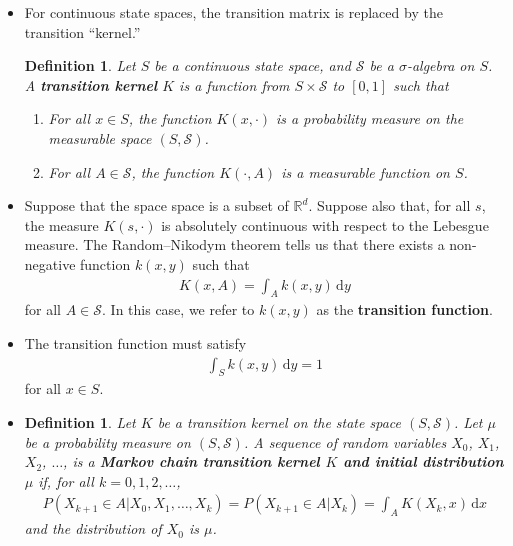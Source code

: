 \documentclass[10pt]{article}
\newtheorem{definition}[lemma]{Definition}
\newcommand{\dee}{\mathrm{d}}
\newcommand{\mcal}[1]{\mathcal{#1}}
\newcommand{\Real}{\mathbb{R}}
\begin{document}
\begin{itemize}
  \item For continuous state spaces, the transition matrix is replaced by the transition ``kernel.''
  
  \begin{definition}
    Let $S$ be a continuous state space, and $\mcal{S}$ be a $\sigma$-algebra on $S$. A {\bf transition kernel} $K$ is a function from $S \times \mcal{S}$ to $[0,1]$ such that
    \begin{enumerate}
      \item For all $x \in S$, the function $K(x,\cdot)$ is a probability measure on the measurable space $(S, \mcal{S})$.
      \item For all $A \in \mcal{S}$, the function $K(\cdot, A)$ is a measurable function on $S$.
    \end{enumerate}
  \end{definition}

  \item Suppose that the space space is a subset of $\Real^d$. Suppose also that, for all $s$, the measure $K(s,\cdot)$ is absolutely continuous with respect to the Lebesgue measure. The Random--Nikodym theorem tells us that there exists a non-negative function $k(x,y)$ such that
  \begin{align*}
    K(x,A) = \int_A k(x,y)\, \dee y
  \end{align*}
  for all $A \in \mcal{S}$. In this case, we refer to $k(x,y)$ as the {\bf transition function}.

  \item The transition function must satisfy
  \begin{align*}
    \int_S k(x,y)\, \dee y = 1
  \end{align*}
  for all $x \in S$.

  \item \begin{definition}
    Let $K$ be a transition kernel on the state space $(S, \mcal{S})$. Let $\mu$ be a probability measure on $(S, \mcal{S})$. A sequence of random variables $X_0$, $X_1$, $X_2$, $\dotsc$, is a {\bf Markov chain transition kernel $K$ and initial distribution $\mu$} if, for all $k = 0, 1, 2, \dotsc$,
    \begin{align*}
      P(X_{k+1} \in A | X_0, X_1, \dotsc, X_k) = P(X_{k+1} \in A | X_k) = \int_A K(X_k, x)\, \dee x
    \end{align*}
    and the distribution of $X_0$ is $\mu$.
  \end{definition}


\end{itemize}
\end{document}
